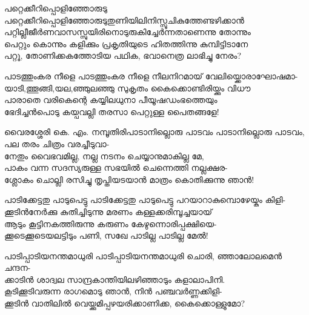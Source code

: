 \begin{enumerate}

\begin{slokam}{\VSr}{\VKG}{പറ്റെക്കീറിപ്പൊളിഞ്ഞോരുടു}
പറ്റെക്കീറിപ്പൊളിഞ്ഞോരുടുതുണിയിലിനിസ്സൂചികുത്തേണ്ടഴിക്കാന്‍\\
പറ്റില്ലീജീര്‍ണവാസസ്സുയിരിനൊടുരുകിച്ചേര്‍ന്നതാണെന്നു തോന്നും\\
പെറ്റും കൊന്നും കളിക്കും പ്രകൃതിയുടെ ഹിതത്തിന്നു കുമ്പിട്ടിടാനേ\\
പറ്റൂ, തോണിക്കകത്തോടിയ പഥിക, ഭവാനെത്ര ലാഭിച്ചു നേരം?
\end{slokam}


\begin{slokam}{\VSv}{\CN}{പാടത്തുംകര നീളെ}
പാടത്തുംകര നീളെ നീലനിറമായ്‌ വേലിയ്ക്കൊരാഘോഷമാ-\\
യാടി,ത്തൂങ്ങി,യല,ഞ്ഞുലഞ്ഞു സുകൃതം കൈക്കൊണ്ടിരിയ്ക്കും വിധൗ\\
പാരാതെ വരികെന്റെ കയ്യിലധുനാ പീയൂഷഡംഭത്തെയും\\
ഭേദിച്ചൻപൊടു കയ്പവല്ലി തരസാ പെറ്റുള്ള പൈതങ്ങളേ!
\end{slokam}


\begin{slokam}{\VSv}{വൈരശ്ശേരി കെ. എം. നമ്പൂതിരി}{പാടാനില്ലൊരു പാടവം}
പാടാനില്ലൊരു പാടവം, പല തരം ചിത്രം വരച്ചീടുവാ-\\
നേതും വൈഭവമില്ല, നല്ല നടനം ചെയ്യാനുമാകില്ല മേ,\\
പാകം വന്ന സദസ്യരുള്ള സഭയിൽ ചെന്നെത്തി നല്ലക്ഷര-\\
ശ്ലോകം ചൊല്ലി രസിച്ചു തൃപ്തിയടയാൻ മാത്രം കൊതിക്കുന്നു ഞാൻ! 
\end{slokam}



\begin{slokam}{\VSv}{\VKG}{പാടിക്കേട്ടതു പാടുപെട്ടു}
പാടിക്കേട്ടതു പാടുപെട്ടു പറയാറാകുമ്പൊഴേയ്കും കിളി-\\
ക്കൂടിൻനേർക്കു കുതിച്ചിടുന്നു മരണം കള്ളക്കരിമ്പൂച്ചയായ്‌\\
ആടും കൂട്ടിനകത്തിരുന്നു കരുണം കേഴുന്നൊരിപ്പക്ഷിയെ-\\
ക്കൂടെക്കൂടെയലട്ടിടും പണി, സഖേ പാടില്ല പാടില്ല മേൽ!
\end{slokam}



\begin{slokam}{\VSv}{\Unk}{പാടിപ്പാടിയനന്തമാധുരി}
പാടിപ്പാടിയനന്തമാധുരി ചൊരി, ഞ്ഞാലോലമെൻ ചന്ദന-\\
ക്കാടിൻ ശാദ്വല സാന്ദ്രകാന്തിയിലഴിഞ്ഞാടും കളാലാപിനി.\\
കൂടിക്കൂടിവരുന്ന രാഗമൊടു ഞാൻ, നിൻ പഞ്ചവർണ്ണക്കിളി-\\
ക്കൂടിൻ വാതിലിൽ വെയ്ക്കുമിപ്പഴയരിക്കാണിക്ക, കൈക്കൊള്ളുമോ?
\end{slokam}


\end{enumerate}
